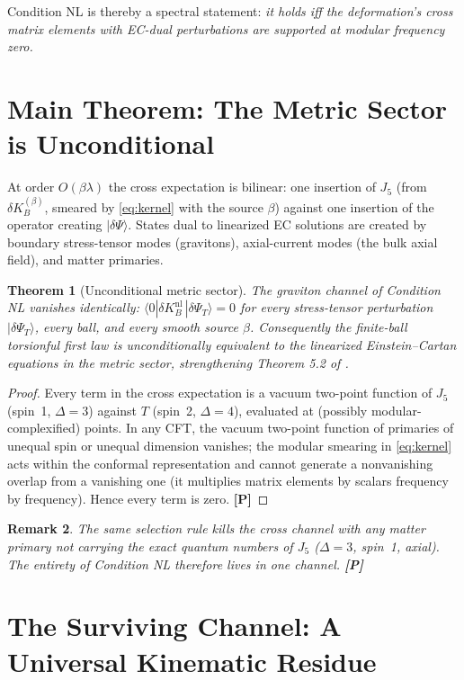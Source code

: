 \documentclass[11pt]{article}
\newtheorem{theorem}{Theorem}[section]
\newtheorem{remark}[theorem]{Remark}
\theoremstyle{definition}
\newcommand{\pP}{\textbf{[P]}}
\begin{document}
Condition NL is thereby a spectral statement: \emph{it holds iff the
deformation's cross matrix elements with EC-dual perturbations are
supported at modular frequency zero.}

\section{Main Theorem: The Metric Sector is Unconditional}

At order $O(\beta\lambda)$ the cross expectation is bilinear: one
insertion of $J_5$ (from $\delta K_B^{(\beta)}$, smeared by
\eqref{eq:kernel} with the source $\beta$) against one insertion of the
operator creating $|\delta\Psi\rangle$. States dual to linearized EC
solutions are created by boundary stress-tensor modes (gravitons),
axial-current modes (the bulk axial field), and matter primaries.

\begin{theorem}[Unconditional metric sector]
\label{thm:metric}
The graviton channel of Condition NL vanishes identically:
$\langle0|\delta K_B^{\mathrm{nl}}\,|\delta\Psi_T\rangle=0$ for every
stress-tensor perturbation $|\delta\Psi_T\rangle$, every ball, and every
smooth source $\beta$. Consequently the finite-ball torsionful first law
is \emph{unconditionally} equivalent to the linearized Einstein--Cartan
equations in the metric sector, strengthening Theorem 5.2 of
\cite{McGwier2026b}.
\end{theorem}

\begin{proof}
Every term in the cross expectation is a vacuum two-point function of
$J_5$ (spin~1, $\Delta=3$) against $T$ (spin~2, $\Delta=4$), evaluated at
(possibly modular-complexified) points. In any CFT, the vacuum two-point
function of primaries of unequal spin or unequal dimension vanishes; the
modular smearing in \eqref{eq:kernel} acts within the conformal
representation and cannot generate a nonvanishing overlap from a vanishing
one (it multiplies matrix elements by scalars frequency by frequency).
Hence every term is zero. \pP{}
\end{proof}

\begin{remark}
The same selection rule kills the cross channel with any matter primary
not carrying the exact quantum numbers of $J_5$ ($\Delta=3$, spin~1,
axial). The entirety of Condition NL therefore lives in one channel.
\pP{}
\end{remark}

\section{The Surviving Channel: A Universal Kinematic Residue}
\end{document}
